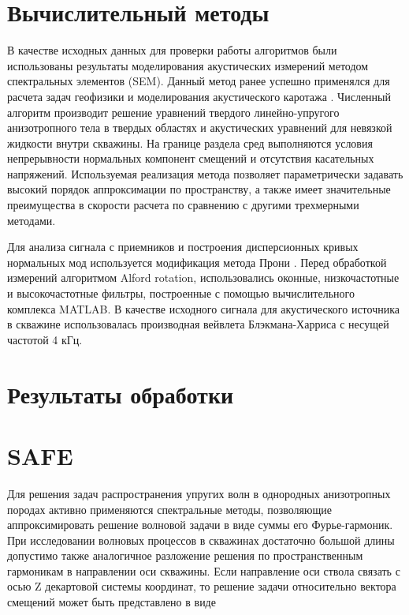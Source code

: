 \documentclass[a4paper,11pt]{article}
\begin{document}
\section{Вычислительный методы}

В качестве исходных данных для проверки работы алгоритмов были использованы результаты моделирования акустических измерений методом спектральных элементов (SEM). Данный метод ранее успешно применялся для расчета задач геофизики \cite{Komatitsch1999} и моделирования акустического каротажа \cite{Charara2011}. Численный алгоритм производит решение уравнений твердого линейно-упругого анизотропного тела в твердых областях и акустических уравнений для невязкой жидкости внутри скважины. На границе раздела сред выполняются условия непрерывности нормальных компонент смещений и отсутствия касательных напряжений. Используемая реализация метода позволяет параметрически задавать высокий порядок аппроксимации по пространству, а также имеет значительные преимущества в скорости расчета по сравнению с другими трехмерными методами.

Для анализа сигнала с приемников и построения дисперсионных кривых нормальных мод используется модификация метода Прони \cite{Ekstrom1995}. Перед обработкой измерений алгоритмом Alford rotation, использовались оконные, низкочастотные и высокочастотные фильтры, построенные с помощью вычислительного комплекса MATLAB. В качестве исходного сигнала для акустического источника в скважине использовалась производная вейвлета Блэкмана-Харриса с несущей частотой 4 кГц. 

\section{Результаты обработки}

\section{SAFE}

Для решения задач распространения упругих волн в однородных анизотропных породах активно применяются спектральные методы, позволяющие аппроксимировать решение волновой задачи в виде суммы его Фурье-гармоник. При исследовании волновых процессов в скважинах достаточно большой длины допустимо также аналогичное разложение решения по пространственным гармоникам в направлении оси скважины. Если направление оси ствола связать с осью Z декартовой системы координат, то решение задачи относительно вектора смещений может быть представлено в виде
\end{document}
